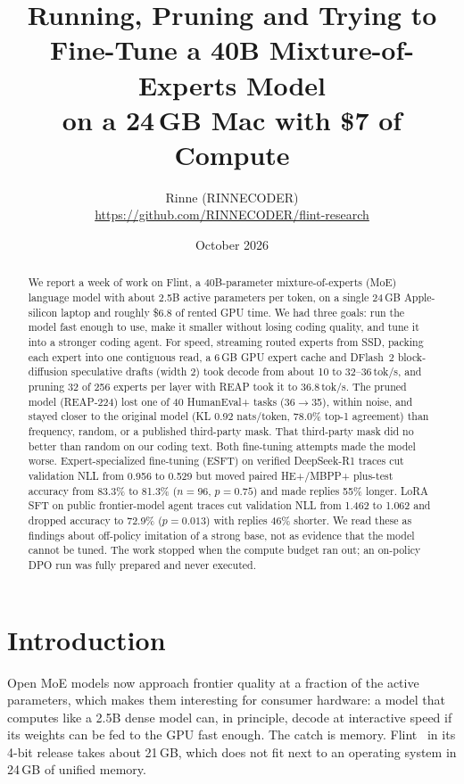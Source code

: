 \documentclass[11pt]{article}
\title{Running, Pruning and Trying to Fine-Tune a 40B Mixture-of-Experts Model\\on a 24\,GB Mac with \$7 of Compute}
\author{Rinne (RINNECODER)\\\small\url{https://github.com/RINNECODER/flint-research}}
\date{October 2026}
\newcommand{\tps}{tok/s}
\begin{document}
\maketitle

\begin{abstract}
We report a week of work on Flint, a 40B-parameter mixture-of-experts (MoE) language model with about 2.5B active
parameters per token, on a single 24\,GB Apple-silicon laptop and roughly \$6.8 of rented GPU time. We had three goals:
run the model fast enough to use, make it smaller without losing coding quality, and tune it into a stronger coding
agent. For speed, streaming routed experts from SSD, packing each expert into one contiguous read, a 6\,GB GPU expert
cache and DFlash~2 block-diffusion speculative drafts (width 2) took decode from about 10 to 32--36\,\tps{}, and pruning
32 of 256 experts per layer with REAP took it to 36.8\,\tps{}. The pruned model (REAP-224) lost one of 40 HumanEval+
tasks (36$\to$35), within noise, and stayed closer to the original model (KL 0.92 nats/token, 78.0\% top-1 agreement)
than frequency, random, or a published third-party mask. That third-party mask did no better than random on our
coding text. Both fine-tuning attempts made the model worse. Expert-specialized fine-tuning (ESFT) on verified
DeepSeek-R1 traces cut validation NLL from 0.956 to 0.529 but moved paired HE+/MBPP+ plus-test accuracy from 83.3\% to
81.3\% ($n{=}96$, $p{=}0.75$) and made replies 55\% longer. LoRA SFT on public frontier-model agent traces cut validation NLL
from 1.462 to 1.062 and dropped accuracy to 72.9\% ($p{=}0.013$) with replies 46\% shorter. We read these as findings
about off-policy imitation of a strong base, not as evidence that the model cannot be tuned. The work stopped when the
compute budget ran out; an on-policy DPO run was fully prepared and never executed.
\end{abstract}

\section{Introduction}

Open MoE models now approach frontier quality at a fraction of the active parameters, which makes them interesting for
consumer hardware: a model that computes like a 2.5B dense model can, in principle, decode at interactive speed if its
weights can be fed to the GPU fast enough. The catch is memory. Flint~\citep{flint} in its 4-bit release takes about
21\,GB, which does not fit next to an operating system in 24\,GB of unified memory.
\end{document}
